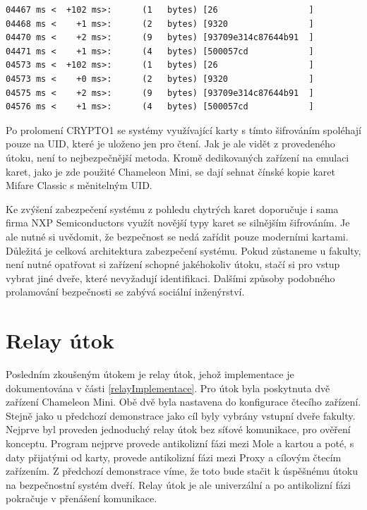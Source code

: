 \begin{lstlisting}[caption=Část komunikace čtecího zařízení, label={emulaceZaznam}]
04467 ms <  +102 ms>:      (1   bytes) [26                  ]
04468 ms <    +1 ms>:      (2   bytes) [9320                ]
04470 ms <    +2 ms>:      (9   bytes) [93709e314c87644b91  ]
04471 ms <    +1 ms>:      (4   bytes) [500057cd            ]
04573 ms <  +102 ms>:      (1   bytes) [26                  ]
04573 ms <    +0 ms>:      (2   bytes) [9320                ]
04575 ms <    +2 ms>:      (9   bytes) [93709e314c87644b91  ]
04576 ms <    +1 ms>:      (4   bytes) [500057cd            ]
\end{lstlisting}
Po prolomení CRYPTO1 se systémy využívající karty s tímto šifrováním spoléhají pouze na UID, které je uloženo jen pro čtení. Jak je ale vidět z provedeného útoku, není to nejbezpečnější metoda. Kromě dedikovaných zařízení na emulaci karet, jako je zde použité Chameleon Mini, se dají sehnat čínské kopie karet Mifare Classic s měnitelným UID. \par
Ke zvýšení zabezpečení systému z pohledu chytrých karet doporučuje i sama firma NXP Semiconductors využít novější typy karet se silnějším šifrováním. Je ale nutné si uvědomit, že bezpečnost se nedá zařídit pouze moderními kartami. Důležitá je celková architektura zabezpečení systému. Pokud zůstaneme u fakulty, není nutné opatřovat si zařízení schopné jakéhokoliv útoku, stačí si pro vstup vybrat jiné dveře, které nevyžadují identifikaci. Dalšími způsoby podobného prolamování bezpečnosti se zabývá sociální inženýrství.

\section{Relay útok}
Posledním zkoušeným útokem je relay útok, jehož implementace je dokumentována v části \ref{relayImplementace}. Pro útok byla poskytnuta dvě zařízení Chameleon Mini. Obě dvě byla nastavena do konfigurace čtecího zařízení. Stejně jako u předchozí demonstrace jako cíl byly vybrány vstupní dveře fakulty. Nejprve byl proveden jednoduchý relay útok bez síťové komunikace, pro ověření konceptu. Program nejprve provede antikolizní fázi mezi Mole a kartou a poté, s daty přijatými od karty, provede antikolizní fázi mezi Proxy a cílovým čtecím zařízením. Z předchozí demonstrace víme, že toto bude stačit k úspěšnému útoku na bezpečnostní systém dveří. Relay útok je ale univerzální a po antikolizní fázi pokračuje v přenášení komunikace. \par

